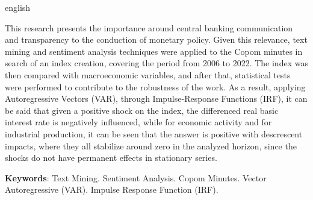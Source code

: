 \begin{resumo}[Abstract]
 \begin{otherlanguage*}{english}

This research presents the importance around central banking communication and transparency to the conduction of monetary policy. Given this relevance, text mining and sentiment analysis techniques were applied to the Copom minutes in search of an index creation, covering the period from 2006 to 2022. The index was then compared with macroeconomic variables, and after that, statistical tests were performed to contribute to the robustness of the work. As a result, applying Autoregressive Vectors (VAR), through Impulse-Response Functions (IRF), it can be said that given a positive shock on the index, the differenced real basic interest rate is negatively influenced, while for economic activity and for industrial production, it can be seen that the answer is positive with descrescent impacts, where they all stabilize around zero in the analyzed horizon, since the shocks do not have permanent effects in stationary series.

\textbf{Keywords}: Text Mining. Sentiment Analysis. Copom Minutes. Vector Autoregressive (VAR). Impulse Response Function (IRF).
 \end{otherlanguage*}
\end{resumo}

